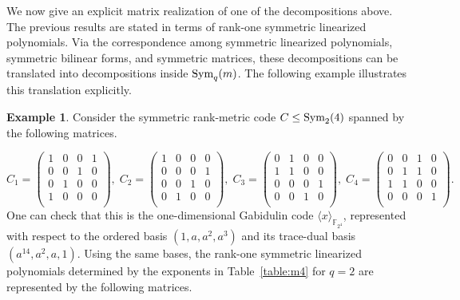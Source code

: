 \documentclass[11pt,a4paper,reqno]{article}
\numberwithin{equation}{section}
\theoremstyle{definition}
\newtheorem{example}[theorem]{Example}
\newcommand{\Sym}{{\textnormal{Sym}}}
\begin{document}
We now give an explicit matrix realization of one of the decompositions above. The previous results are stated in terms of rank-one symmetric linearized
polynomials. Via the correspondence among symmetric linearized polynomials,
symmetric bilinear forms, and symmetric matrices, these decompositions can be
translated into decompositions inside \(\Sym_q(m)\). The following example
illustrates this translation explicitly.

\begin{example}
    Consider the symmetric rank-metric code $C\leq\Sym_2(4)$ spanned by the following matrices.

    \begin{equation*}
        C_1=\begin{pmatrix}
1 & 0 & 0 & 1\\
0 & 0 & 1 & 0\\
0 & 1 & 0 & 0\\
1 & 0 & 0 & 0\\
\end{pmatrix},\;
C_2=\begin{pmatrix}
1 & 0 & 0 & 0\\
0 & 0 & 0 & 1\\
0 & 0 & 1 & 0\\
0 & 1 & 0 & 0\\
\end{pmatrix},\;
C_3=\begin{pmatrix}
0 & 1 & 0 & 0\\
1 & 1 & 0 & 0\\
0 & 0 & 0 & 1\\
0 & 0 & 1 & 0\\
\end{pmatrix},\;
C_4=\begin{pmatrix}
0 & 0 & 1 & 0\\
0 & 1 & 1 & 0\\
1 & 1 & 0 & 0\\
0 & 0 & 0 & 1\\
\end{pmatrix}.
    \end{equation*}
One can  check that this is the one-dimensional Gabidulin code \(\langle x\rangle_{\mathbb F_{2^4}}\),
represented with respect to the ordered basis $(1,a,a^2,a^3)$ and its trace-dual basis $(a^{14},a^2,a,1)$. Using the same bases, the rank-one symmetric linearized polynomials determined
by the exponents in Table~\ref{table:m4} for \(q=2\) are represented by the
following matrices.
\begin{equation*}
\begin{array}{ccc}

\end{array}
\end{equation*}
\end{example}
\end{document}
